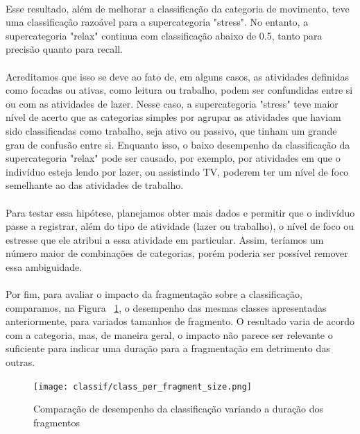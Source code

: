             \paragraph{} Esse resultado, além de melhorar a classificação da categoria de movimento, teve uma classificação razoável para a supercategoria "stress". No entanto, a supercategoria "relax" continua com classificação abaixo de 0.5, tanto para precisão quanto para recall. 
            \paragraph{} Acreditamos que isso se deve ao fato de, em alguns casos, as atividades definidas como focadas ou ativas, como leitura ou trabalho, podem ser confundidas entre si ou com as atividades de lazer. Nesse caso, a supercategoria "stress" teve maior nível de acerto que as categorias simples por agrupar as atividades que haviam sido classificadas como trabalho, seja ativo ou passivo, que tinham um grande grau de confusão entre si. Enquanto isso, o baixo desempenho da classificação da supercategoria "relax" pode ser causado, por exemplo, por atividades em que o indivíduo esteja lendo por lazer, ou assistindo TV, poderem ter um nível de foco semelhante ao das atividades de trabalho.
            \paragraph{} Para testar essa hipótese, planejamos obter mais dados e permitir que o indivíduo passe a registrar, além do tipo de atividade (lazer ou trabalho), o nível de foco ou estresse que ele atribui a essa atividade em particular. Assim, teríamos um número maior de combinações de categorias, porém poderia ser possível remover essa ambiguidade.
            
            \paragraph{} Por fim, para avaliar o impacto da fragmentação sobre a classificação, comparamos, na Figura ~\ref{class_per_fragment}, o desempenho das mesmas classes apresentadas anteriormente, para variados tamanhos de fragmento. O resultado varia de acordo com a categoria, mas, de maneira geral, o impacto não parece ser relevante o suficiente para indicar uma duração para a fragmentação em detrimento das outras.

            \begin{figure}[h!]
            	\centering
            	\texttt{[image: classif/class\_per\_fragment\_size.png]}
            	\caption{Comparação de desempenho da classificação variando a duração dos fragmentos}
                \label{class_per_fragment}
            \end{figure}            

